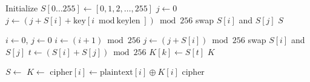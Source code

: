 \begin{algorithm}
\caption{RC4 Key Scheduling Algorithm (KSA)}
\begin{algorithmic}[1]
    \State Initialize $S[0 \ldots 255] \gets [0, 1, 2, \ldots, 255]$
    \State $j \gets 0$
        \State $j \gets (j + S[i] + \text{key}[i \bmod \text{keylen}]) \bmod 256$
        \State swap $S[i]$ and $S[j]$
    \EndFor
    \State \Return $S$
\EndProcedure
\end{algorithmic}
\end{algorithm}

\begin{algorithm}
\caption{RC4 Pseudo-Random Generation Algorithm (PRGA)}
\begin{algorithmic}[1]
    \State $i \gets 0$, $j \gets 0$
        \State $i \gets (i + 1) \bmod 256$
        \State $j \gets (j + S[i]) \bmod 256$
        \State swap $S[i]$ and $S[j]$
        \State $t \gets (S[i] + S[j]) \bmod 256$
        \State $K[k] \gets S[t]$ 
    \EndFor
    \State \Return $K$
\EndProcedure
\end{algorithmic}
\end{algorithm}

\begin{algorithm}
\caption{RC4 Encryption}
\begin{algorithmic}[1]
    \State $S \gets$ 
    \State $K \gets$ 
        \State $\text{cipher}[i] \gets \text{plaintext}[i] \oplus K[i]$
    \EndFor
    \State \Return $\text{cipher}$
\EndProcedure
\end{algorithmic}
\end{algorithm}


